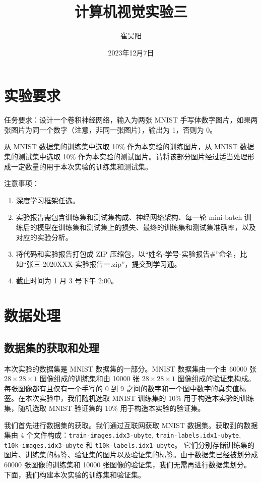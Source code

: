 \documentclass[supercite]{Experimental_Report}
\title{~~~~~~计算机视觉实验三~~~~~~}
\author{崔昊阳}
\date{2023年12月7日}
\theoremstyle{definition}
\begin{document}
\maketitle

\clearpage


\tableofcontents[level=2]

\clearpage


\section{实验要求}
任务要求：设计一个卷积神经网络，输入为两张 MNIST 手写体数字图片，如果两张图片为同一个数字（注意，非同一张图片），输出为 1，否则为 0。

从 MNIST 数据集的训练集中选取 10\% 作为本实验的训练图片，从 MNIST 数据集的测试集中选取 10\% 作为本实验的测试图片。请将该部分图片经过适当处理形成一定数量的用于本次实验的训练集和测试集。

注意事项：
\begin{enumerate}
	\item 深度学习框架任选。
	\item 实验报告需包含训练集和测试集构成、神经网络架构、每一轮 mini-batch 训练后的模型在训练集和测试集上的损失、最终的训练集和测试集准确率，以及对应的实验分析。
	\item 将代码和实验报告打包成 ZIP 压缩包，以“姓名-学号-实验报告\#”命名，比如“张三-2020XXX-实验报告一.zip”，提交到学习通。
	\item 截止时间为 1 月 3 号下午 2:00。
\end{enumerate}

\section{数据处理}
\subsection{数据集的获取和处理}
本次实验的数据集是 MNIST 数据集的一部分。MNIST 数据集由一个由 60000 张 $28\times 28\times 1$ 图像组成的训练集和由 10000 张 $28\times 28\times 1$ 图像组成的验证集构成。
每张图像都有且仅有一个手写的 0 到 9 之间的数字和一个图中数字的真实值标签。在本次实验中，我们随机选取 MNIST 训练集的 10\% 用于构造本实验的训练集，随机选取 MNIST 验证集的 10\% 用于构造本实验的验证集。

我们首先进行数据集的获取。我们通过互联网获取 MNIST 数据集。获取到的数据集由 4 个文件构成：\texttt{train-images.idx3-ubyte}, \texttt{train-labels.idx1-ubyte}, \texttt{t10k-images.idx3-ubyte} 和 \texttt{t10k-labels.idx1-ubyte}。
它们分别存储训练集的图片、训练集的标签、验证集的图片以及验证集的标签。由于数据集已经被划分成 60000 张图像的训练集和 10000 张图像的验证集，我们无需再进行数据集划分。
下面，我们构建本次实验的训练集和验证集。
\end{document}
